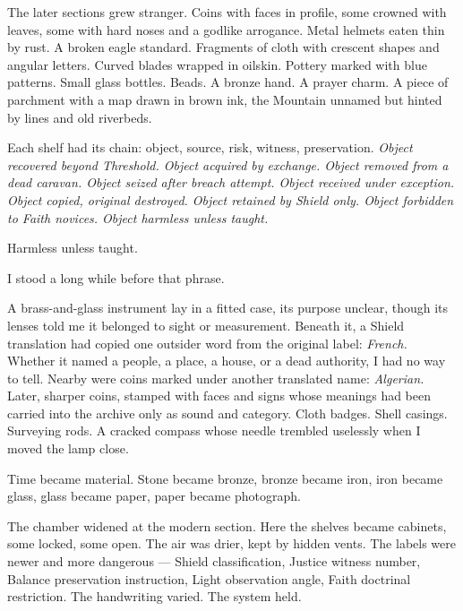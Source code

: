 The later sections grew stranger. Coins with faces in profile, some crowned with leaves, some with hard noses and a godlike arrogance. Metal helmets eaten thin by rust. A broken eagle standard. Fragments of cloth with crescent shapes and angular letters. Curved blades wrapped in oilskin. Pottery marked with blue patterns. Small glass bottles. Beads. A bronze hand. A prayer charm. A piece of parchment with a map drawn in brown ink, the Mountain unnamed but hinted by lines and old riverbeds.\par

Each shelf had its chain: object, source, risk, witness, preservation. \textit{Object recovered beyond Threshold. Object acquired by exchange. Object removed from a dead caravan. Object seized after breach attempt. Object received under exception. Object copied, original destroyed. Object retained by Shield only. Object forbidden to Faith novices. Object harmless unless taught.}\par

Harmless unless taught.\par

I stood a long while before that phrase.\par

A brass-and-glass instrument lay in a fitted case, its purpose unclear, though its lenses told me it belonged to sight or measurement. Beneath it, a Shield translation had copied one outsider word from the original label: \textit{French.} Whether it named a people, a place, a house, or a dead authority, I had no way to tell. Nearby were coins marked under another translated name: \textit{Algerian.} Later, sharper coins, stamped with faces and signs whose meanings had been carried into the archive only as sound and category. Cloth badges. Shell casings. Surveying rods. A cracked compass whose needle trembled uselessly when I moved the lamp close.\par

Time became material. Stone became bronze, bronze became iron, iron became glass, glass became paper, paper became photograph.\par

The chamber widened at the modern section. Here the shelves became cabinets, some locked, some open. The air was drier, kept by hidden vents. The labels were newer and more dangerous --- Shield classification, Justice witness number, Balance preservation instruction, Light observation angle, Faith doctrinal restriction. The handwriting varied. The system held.\par

